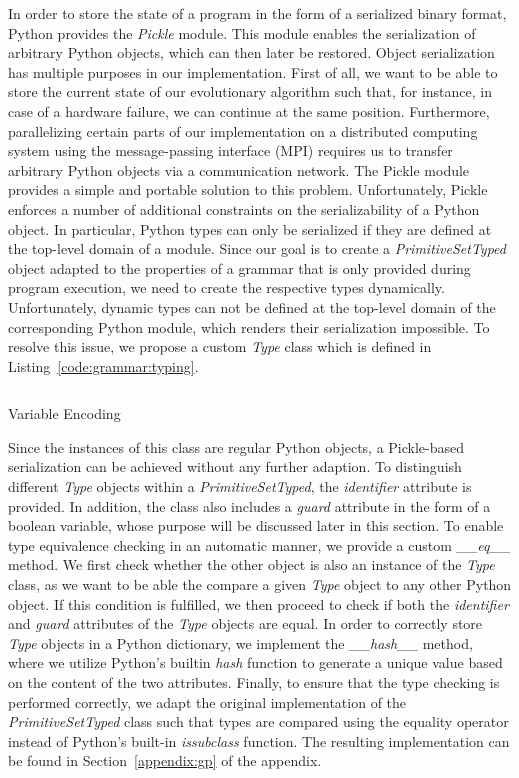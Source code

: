 In order to store the state of a program in the form of a serialized binary format, Python provides the \emph{Pickle} module.
This module enables the serialization of arbitrary Python objects, which can then later be restored.
Object serialization has multiple purposes in our implementation.
First of all, we want to be able to store the current state of our evolutionary algorithm such that, for instance, in case of a hardware failure, we can continue at the same position.
Furthermore, parallelizing certain parts of our implementation on a distributed computing system using the message-passing interface (MPI) requires us to transfer arbitrary Python objects via a communication network.
The Pickle module provides a simple and portable solution to this problem.
Unfortunately, Pickle enforces a number of additional constraints on the serializability of a Python object.
In particular, Python types can only be serialized if they are defined at the top-level domain of a module.
Since our goal is to create a \emph{PrimitiveSetTyped} object adapted to the properties of a grammar that is only provided during program execution, we need to create the respective types dynamically.
Unfortunately, dynamic types can not be defined at the top-level domain of the corresponding Python module, which renders their serialization impossible.
To resolve this issue, we propose a custom \emph{Type} class which is defined in Listing~\ref{code:grammar:typing}.
\begin{listing}
	\inputminted{python}{evostencils/grammar/typing.py}
	\caption{Variable Encoding}
	\label{code:grammar:typing}
\end{listing}
Since the instances of this class are regular Python objects, a Pickle-based serialization can be achieved without any further adaption.
To distinguish different \emph{Type} objects within a \emph{PrimitiveSetTyped}, the \emph{identifier} attribute is provided.
In addition, the class also includes a \emph{guard} attribute in the form of a boolean variable, whose purpose will be discussed later in this section. 
To enable type equivalence checking in an automatic manner, we provide a custom \emph{\_\_eq\_\_} method.
We first check whether the other object is also an instance of the \emph{Type} class, as we want to be able the compare a given \emph{Type} object to any other Python object.
If this condition is fulfilled, we then proceed to check if both the \emph{identifier} and \emph{guard} attributes of the \emph{Type} objects are equal.
In order to correctly store \emph{Type} objects in a Python dictionary, we implement the \emph{\_\_hash\_\_} method, where we utilize Python's builtin \emph{hash} function to generate a unique value based on the content of the two attributes. 
Finally, to ensure that the type checking is performed correctly, we adapt the original implementation of the \emph{PrimitiveSetTyped} class such that types are compared using the equality operator instead of Python's built-in \emph{issubclass} function.
The resulting implementation can be found in Section~\ref{appendix:gp} of the appendix.

